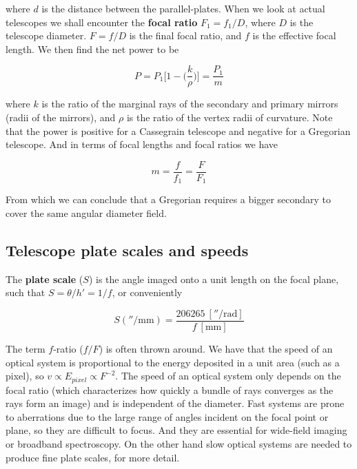 \documentclass[a4paper]{article}
\begin{document}
where $d$ is the distance between the parallel-plates. When we look at actual telescopes we shall encounter the \textbf{focal ratio} $F_1=f_1/D$, where $D$ is the telescope diameter. $F=f/D$ is the final focal ratio, and $f$ is the effective focal length. We then find the net power to be

\begin{equation}
    P=P_1\bigg[1-\bigg(\frac{k}{\rho}\bigg)\bigg]=\frac{P_1}{m}
\end{equation}

where $k$ is the ratio of the marginal rays of the secondary and primary mirrors (radii of the mirrors), and $\rho$ is the ratio of the vertex radii of curvature. Note that the power is positive for a Cassegrain telescope and negative for a Gregorian telescope. And in terms of focal lengths and focal ratios we have

\begin{equation}
    m=\frac{f}{f_1}=\frac{F}{F_1}
\end{equation}

From which we can conclude that a Gregorian requires a bigger secondary to cover the same angular diameter field. 

\subsection{Telescope plate scales and speeds}

The \textbf{plate scale} ($S$) is the angle imaged onto a unit length on the focal plane, such that $S=\theta/h'=1/f$, or conveniently

\begin{equation}
    S (\si{\arcsecond\per\milli\meter}) = \frac{206265 \ [\si{\arcsecond\per\radian}]}{f \ [\si{\milli\meter}]}
\end{equation}

The term $f$-ratio ($f/F$) is often thrown around. We have that the speed of an optical system is proportional to the energy deposited in a unit area (such as a pixel), so $v\propto E_{pixel}\propto F^{-2}$. The speed of an optical system only depends on the focal ratio (which characterizes how quickly a bundle of rays converges as the rays form an image) and is independent of the diameter. Fast systems are prone to aberrations due to the large range of angles incident on the focal point or plane, so they are difficult to focus. And they are essential for wide-field imaging or broadband spectroscopy. On the other hand slow optical systems are needed to produce fine plate scales, for more detail.
\end{document}
